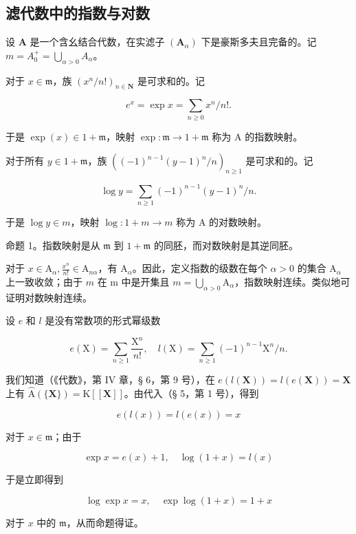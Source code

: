 \subsection{滤代数中的指数与对数}

设 \(\mathbf{A}\) 是一个含幺结合代数，在实滤子 \((\mathbf{A}_{\alpha})\) 下是豪斯多夫且完备的。记 \(m = A_0^+ = \bigcup_{\alpha > 0} A_\alpha\)。

对于 \(x \in \mathfrak{m}\)，族 \((x^n / n!)_{n \in \mathbf{N}}\) 是可求和的。记

\[
e ^ {x} = \exp x = \sum_ {n \geqslant 0} x ^ {n} / n!.\tag{1}
\]

于是 \(\exp (x)\in 1 + \mathfrak{m}\)，映射 \(\exp \colon \mathfrak{m}\to 1 + \mathfrak{m}\) 称为 A 的指数映射。

对于所有 \(y \in 1 + \mathfrak{m}\)，族 \(((-1)^{n-1}(y - 1)^n / n)_{n \geqslant 1}\) 是可求和的。记

\[
\log y = \sum_ {n \geqslant 1} (- 1) ^ {n - 1} (y - 1) ^ {n} / n.\tag{2}
\]

于是 \(\log y \in m\)，映射 \(\log: 1 + m \to m\) 称为 A 的对数映射。

命题 1。指数映射是从 \(\mathfrak{m}\) 到 \(1 + \mathfrak{m}\) 的同胚，而对数映射是其逆同胚。

对于 \(x \in \mathrm{A}_{\alpha}, \frac{x^n}{n!} \in \mathrm{A}_{n\alpha}\)，有 \(\mathrm{A}_{\alpha}\)。因此，定义指数的级数在每个 \(\alpha > 0\) 的集合 \(\mathrm{A}_{\alpha}\) 上一致收敛；由于 \(m\) 在 m 中是开集且 \(m = \bigcup_{\alpha > 0} \mathrm{A}_{\alpha}\)，指数映射连续。类似地可证明对数映射连续。

设 \(e\) 和 \(l\) 是没有常数项的形式幂级数

\[
e (\mathrm{X}) = \sum_ {n \geqslant 1} \frac {\mathrm{X} ^ {n}}{n !}, \quad l (\mathrm{X}) = \sum_ {n \geqslant 1} (- 1) ^ {n - 1} \mathrm{X} ^ {n} / n.
\]

我们知道（《代数》，第 IV 章，§ 6，第 9 号），在 \(e(l(\mathbf{X})) = l(e(\mathbf{X})) = \mathbf{X}\) 上有 \(\hat{\mathrm{A}}(\{\mathbf{X}\}) = \mathrm{K}[[\mathbf{X}]]\)。由代入（§ 5，第 1 号），得到

\[
e (l (x)) = l (e (x)) = x
\]

对于 \(x\in \mathfrak{m}\)；由于

\[
\exp x = e (x) + 1, \quad \log (1 + x) = l (x)
\]

于是立即得到

\[
\log \exp x = x, \quad \exp \log (1 + x) = 1 + x
\]

对于 \(x\) 中的 \(\mathfrak{m}\)，从而命题得证。

